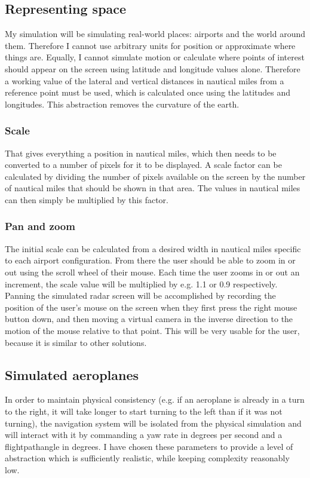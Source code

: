 \documentclass{article}
\begin{document}
\subsection{Representing space}
My simulation will be simulating real-world places: airports and the world around them.
Therefore I cannot use arbitrary units for position or approximate where things are.
Equally, I cannot simulate motion or calculate where points of interest should appear on the screen using latitude and longitude values alone.
Therefore a working value of the lateral and vertical distances in nautical miles from a reference point must be used, which is calculated once using the latitudes and longitudes.
This abstraction removes the curvature of the earth.

\subsubsection{Scale}
That gives everything a position in nautical miles, which then needs to be converted to a number of pixels for it to be displayed.
A scale factor can be calculated by dividing the number of pixels available on the screen by the number of nautical miles that should be shown in that area.
The values in nautical miles can then simply be multiplied by this factor.

\subsubsection{Pan and zoom}
The initial scale can be calculated from a desired width in nautical miles specific to each airport configuration.
From there the user should be able to zoom in or out using the scroll wheel of their mouse.
Each time the user zooms in or out an increment, the scale value will be multiplied by e.g. 1.1 or 0.9 respectively.
Panning the simulated radar screen will be accomplished by recording the position of the user's mouse on the screen when they first press the right mouse button down, and then moving a virtual camera in the inverse direction to the motion of the mouse relative to that point. This will be very usable for the user, because it is similar to other solutions.

\subsection{Simulated aeroplanes}
In order to maintain physical consistency (e.g. if an aeroplane is already in a turn to the right, it will take longer to start turning to the left than if it was not turning), the navigation system will be isolated from the physical simulation and will interact with it by commanding a yaw rate in degrees per second and a \gls{flightpathangle} in degrees.
I have chosen these parameters to provide a level of abstraction which is sufficiently realistic, while keeping complexity reasonably low.
\end{document}
